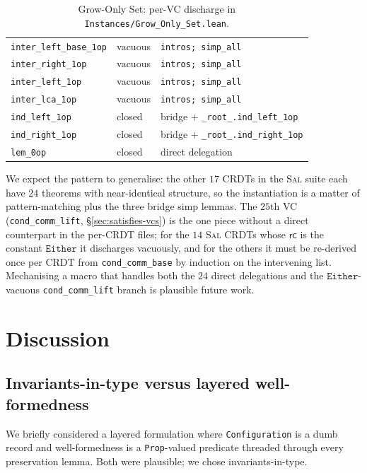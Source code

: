 \documentclass[11pt,a4paper]{article}
\theoremstyle{definition}
\theoremstyle{remark}
\newcommand{\mrc}{\mathsf{rc}}
\newcommand{\Either}{\mathtt{Either}}
\newcommand{\Sal}{\textsc{Sal}}
\begin{document}
\begin{table}[t]
\begin{tabular}{@{}llp{6cm}@{}}
    \texttt{inter\_left\_base\_1op}  & vacuous & \texttt{intros; simp\_all} \\
    \texttt{inter\_right\_1op}       & vacuous & \texttt{intros; simp\_all} \\
    \texttt{inter\_left\_1op}        & vacuous & \texttt{intros; simp\_all} \\
    \texttt{inter\_lca\_1op}         & vacuous & \texttt{intros; simp\_all} \\
    \texttt{ind\_left\_1op}          & closed & bridge + \texttt{\_root\_.ind\_left\_1op} \\
    \texttt{ind\_right\_1op}         & closed & bridge + \texttt{\_root\_.ind\_right\_1op} \\
    \texttt{lem\_0op}                & closed & direct delegation \\
    \bottomrule
  \end{tabular}
  \caption{Grow-Only Set: per-VC discharge in
    \texttt{Instances/Grow\_Only\_Set.lean}.}
  \label{tab:gset-vcs}
\end{table}

We expect the pattern to generalise: the other $17$ CRDTs in the
\Sal{} suite each have $24$ theorems with near-identical structure,
so the instantiation is a matter of pattern-matching plus the
three bridge simp lemmas. The $25$th VC (\texttt{cond\_comm\_lift},
\S\ref{sec:satisfies-vcs}) is the one piece without a direct
counterpart in the per-CRDT files; for the $14$ \Sal{} CRDTs whose
$\mrc$ is the constant $\Either$ it discharges vacuously, and for
the others it must be re-derived once per CRDT from
\texttt{cond\_comm\_base} by induction on the intervening list.
Mechanising a macro that handles both the $24$ direct delegations
and the $\Either$-vacuous \texttt{cond\_comm\_lift} branch is
plausible future work.

\section{Discussion}
\label{sec:discussion}

\subsection{Invariants-in-type versus layered well-formedness}

We briefly considered a layered formulation where
\texttt{Configuration} is a dumb record and well-formedness is a
\texttt{Prop}-valued predicate threaded through every preservation
lemma. Both were plausible; we chose invariants-in-type.
\end{document}
